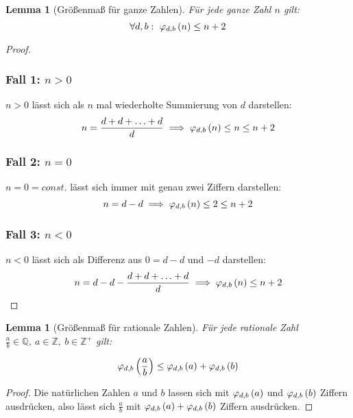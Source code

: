\documentclass{article}
\newtheorem{lemma}[theorem]{Lemma}
\theoremstyle{nonumberplain}
\newtheorem{proof}{Beweis}
\begin{document}
\begin{lemma}[Größenmaß für ganze Zahlen]\label{lemma:measure_linear}
    Für jede ganze Zahl \(n\) gilt:
    \[\forall d, b:\  \varphi_{d,b}\left(n\right) \leq n+2\]
\end{lemma}
\begin{proof}
    \subsubsection*{Fall 1: \(n > 0\)}
        
    \(n > 0\) lässt sich als \(n\) mal wiederholte Summierung von \(d\) darstellen:
    \[n = \frac{d+d+\ldots+d}{d} \implies \varphi_{d,b}\left(n\right) \leq n \leq n + 2\]

    \subsubsection*{Fall 2: \(n = 0\)}
        
    \(n = 0 = const.\) lässt sich immer mit genau zwei Ziffern darstellen:
    \[n = d - d \implies \varphi_{d,b}\left(n\right) \leq 2 \leq n + 2\]

    \subsubsection*{Fall 3: \(n < 0\)}
        
    \(n < 0\) lässt sich als Differenz aus \(0 = d-d\) und \(-d\) darstellen:
    \[n = d - d - \frac{d+d+\ldots+d}{d} \implies \varphi_{d,b}\left(n\right) \leq n + 2\]
\end{proof}

\begin{lemma}[Größenmaß für rationale Zahlen]\label{lemma:phi_rational}
    Für jede rationale Zahl \(\frac{a}{b}\in\mathbb{Q},\ a\in\mathbb{Z},\ b\in\mathbb{Z}^+\) gilt:

    \[\varphi_{d,b}\left(\frac{a}{b}\right) \leq \varphi_{d,b}\left(a\right) + \varphi_{d,b}\left(b\right)\]
\end{lemma}
\begin{proof}
    Die natürlichen Zahlen \(a\) und \(b\) lassen sich mit \(\varphi_{d,b}\left(a\right)\) und \(\varphi_{d,b}\left(b\right)\) Ziffern ausdrücken, also lässt sich \(\frac{a}{b}\) mit \(\varphi_{d,b}\left(a\right) + \varphi_{d,b}\left(b\right)\) Ziffern ausdrücken.
\end{proof}
\end{document}
